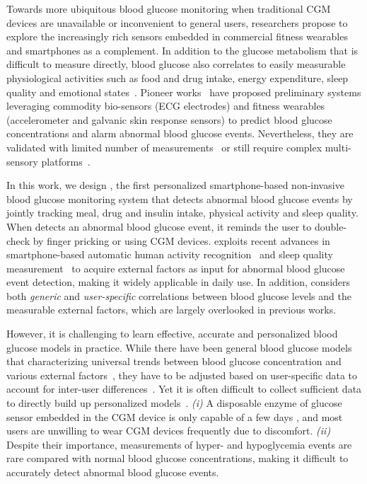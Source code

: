 Towards more ubiquitous blood glucose monitoring when traditional CGM devices are unavailable or inconvenient to general users, researchers propose to explore the increasingly rich sensors embedded in commercial fitness wearables and smartphones as a complement.
In addition to the glucose metabolism that is difficult to measure directly, blood glucose also correlates to easily measurable physiological activities such as food and drug intake, energy expenditure, sleep quality and emotional states~\cite{bib:DRCP15:Iwasaki}.
Pioneer works~\cite{bib:EMBC12:Nguyen, bib:SEMPER16:Ranvier, bib:JDST14:Sobel} have proposed preliminary systems leveraging commodity bio-sensors (\eg ECG electrodes) and fitness wearables (\eg accelerometer and galvanic skin response sensors) to predict blood glucose concentrations and alarm abnormal blood glucose events.
Nevertheless, they are validated with limited number of measurements~\cite{bib:SEMPER16:Ranvier, bib:JDST14:Sobel} or still require complex multi-sensory platforms~\cite{bib:EMBC12:Nguyen, bib:JDST14:Sobel}.

In this work, we design \sysname, the first personalized smartphone-based non-invasive blood glucose monitoring system that detects abnormal blood glucose events by jointly tracking meal, drug and insulin intake, physical activity and sleep quality.
When \sysname detects an abnormal blood glucose event, it reminds the user to double-check by finger pricking or using CGM devices.
\sysname exploits recent advances in smartphone-based automatic human activity recognition~\cite{bib:KDDEN11:Kwapisz} and sleep quality measurement~\cite{bib:UbiComp14:Gu} to acquire external factors as input for abnormal blood glucose event detection, making it widely applicable in daily use.
In addition, \sysname considers both \emph{generic} and \emph{user-specific} correlations between blood glucose levels and the measurable external factors, which are largely overlooked in previous works.

However, it is challenging to learn effective, accurate and personalized blood glucose models in practice.
While there have been general blood glucose models that characterizing universal trends between blood glucose concentration and various external factors~\cite{bib:IJNMBE16:Oviedo}, they have to be adjusted based on user-specific data to account for inter-user differences~\cite{bib:ICMLA13:Bunescu}.
Yet it is often difficult to collect sufficient data to directly build up personalized models~\cite{bib:KDHealth16:Marling}.
\emph{(i)}
A disposable enzyme of glucose sensor embedded in the CGM device is only capable of a few days \cite{bib:CGM_wiki, bib:CGM_wave}, and most users are unwilling to wear CGM devices frequently due to discomfort.
\emph{(ii)}
Despite their importance, measurements of hyper- and hypoglycemia events are rare compared with normal blood glucose concentrations, making it difficult to accurately detect abnormal blood glucose events.

